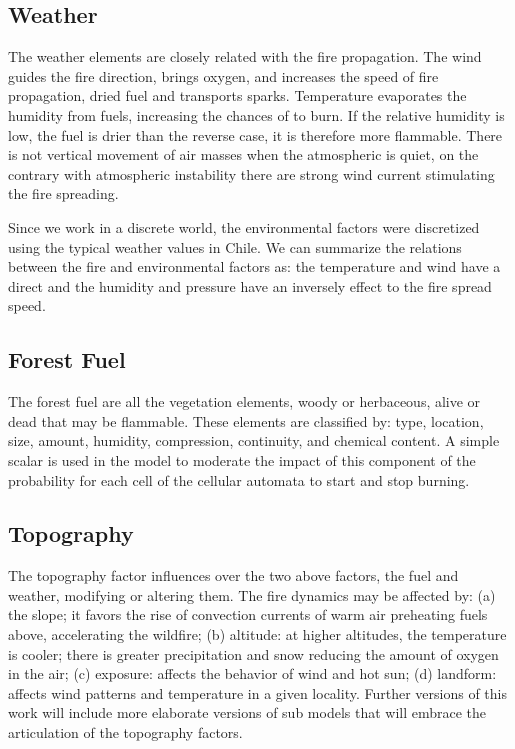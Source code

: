 \documentclass[conference]{IEEEtran}
\begin{document}
    
    \subsection{Weather}
        
      The weather elements are closely related with the fire propagation. The wind guides the fire direction, 
      brings oxygen, and increases the speed of fire propagation, dried fuel and transports sparks. Temperature 
      evaporates the humidity from fuels, increasing the chances of to burn. If the relative humidity is low, the 
      fuel is drier than the reverse case, it is therefore more flammable. There is not vertical movement of air 
      masses when the atmospheric is quiet, on the contrary with atmospheric instability there are strong wind 
      current stimulating the fire spreading. 
      
      Since we work in a discrete world, the environmental factors were discretized using the typical weather values 
      in Chile. We can summarize the relations between the fire and environmental factors as: the temperature and 
      wind have a direct and the humidity and pressure have an inversely effect to the fire spread speed. 

    
    \subsection{Forest Fuel}
    
      The forest fuel are all the vegetation elements, woody or herbaceous, alive or dead
      that may be flammable. These elements are classified by: type, location, size, amount,
      humidity, compression, continuity, and chemical content. A simple scalar
      is used in the model to moderate the impact of this component of the probability for each cell of
      the cellular automata to start and stop burning.
        
        
    \subsection{Topography}
    
      The topography factor influences over the two above factors, the fuel and weather,
      modifying or altering them. The fire dynamics may be affected by: (a) the slope; it
      favors the rise of convection currents of warm air preheating fuels above, accelerating
      the wildfire; (b) altitude: at higher altitudes, the temperature is cooler; there is greater
      precipitation and snow reducing the amount of oxygen in the air; (c) exposure: affects
      the behavior of wind and hot sun; (d) landform: affects wind patterns and temperature
      in a given locality. %
      Further versions of this work will include more elaborate versions of sub
      models that will embrace the articulation of the topography factors. 
\end{document}
